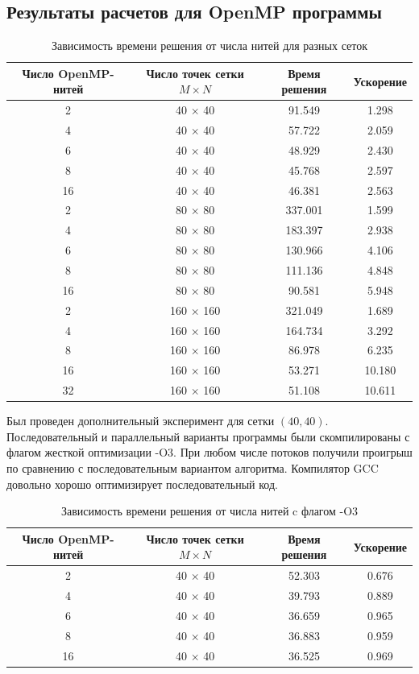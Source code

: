 \documentclass[oneside,final,14pt]{extreport}
\begin{document}
\subsection{Результаты расчетов для OpenMP программы}
\begin{table}[ht]
\begin{tabular}{|c|c|c|c|}
\hline
Число OpenMP-нитей & Число точек сетки \(M \times N\) &
Время решения & Ускорение \\
\hline
2  & 40 \(\times\) 40 & 91.549 & 1.298 \\
4  & 40 \(\times\) 40 & 57.722 & 2.059 \\
6  & 40 \(\times\) 40 & 48.929 & 2.430 \\
8  & 40 \(\times\) 40 & 45.768 & 2.597 \\
16 & 40 \(\times\) 40 & 46.381 & 2.563 \\
\hline
2  & 80 \(\times\) 80 & 337.001 & 1.599 \\
4  & 80 \(\times\) 80 & 183.397 & 2.938 \\
6  & 80 \(\times\) 80 & 130.966 & 4.106 \\
8  & 80 \(\times\) 80 & 111.136 & 4.848 \\
16 & 80 \(\times\) 80 & 90.581  & 5.948 \\
\hline
2  & 160 \(\times\) 160 & 321.049 & 1.689  \\
4  & 160 \(\times\) 160 & 164.734 & 3.292  \\
8  & 160 \(\times\) 160 & 86.978  & 6.235  \\
16 & 160 \(\times\) 160 & 53.271  & 10.180 \\
32 & 160 \(\times\) 160 & 51.108  & 10.611 \\
\hline
\end{tabular}
\caption{Зависимость времени решения от числа нитей для разных сеток}
\label{tab1}
\end{table}

\noindent
Был проведен дополнительный эксперимент для сетки \( (40, 40) \).
Последовательный и параллельный варианты программы были
скомпилированы с флагом жесткой оптимизации -O3. При любом числе
потоков получили проигрыш по сравнению с последовательным вариантом
алгоритма. Компилятор GCC довольно хорошо оптимизирует последовательный код.
\begin{table}[ht]
\begin{tabular}{|c|c|c|c|}
\hline
Число OpenMP-нитей & Число точек сетки \(M \times N\) &
Время решения & Ускорение \\
\hline
2  & 40 \(\times\) 40 & 52.303 & 0.676 \\
4  & 40 \(\times\) 40 & 39.793 & 0.889 \\
6  & 40 \(\times\) 40 & 36.659 & 0.965 \\
8  & 40 \(\times\) 40 & 36.883 & 0.959 \\
16 & 40 \(\times\) 40 & 36.525 & 0.969 \\
\hline
\end{tabular}
\caption{Зависимость времени решения от числа нитей c флагом -O3}
\label{tab2}
\end{table}
\end{document}
